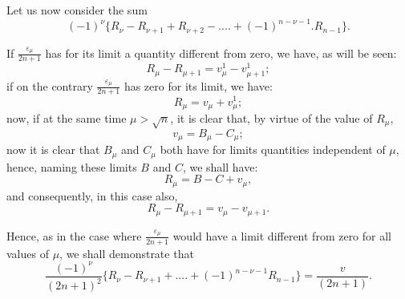 \documentclass{article}
\begin{document}
Let us now consider the sum
\[ (-1)^{\nu}\{R_{\nu}-R_{\nu+1}+R_{\nu+2}-....+(-1)^{n-\nu-1}.R_{n-1}\}. \]

If $\frac{\varepsilon_{\mu}}{2n+1}$ has for its limit a quantity different from zero, we have, as will be seen:
\[ R_{\mu}-R_{\mu+1}=v_{\mu}^{1}-v_{\mu+1}^{1}; \]
if on the contrary $\frac{\varepsilon_{\mu}}{2n+1}$ has zero for its limit, we have:
\[ R_{\mu}=v_{\mu}+v_{\mu}^{1}; \]
now, if at the same time $\mu>\sqrt{n}$, it is clear that, by virtue of the value of $R_{\mu}$,
\[ v_{\mu}=B_{\mu}-C_{\mu}; \]
now it is clear that $B_{\mu}$ and $C_{\mu}$ both have for limits quantities independent of $\mu$, hence, naming these limits $B$ and $C$, we shall have:
\[ R_{\mu}=B-C+v_{\mu}, \]
and consequently, in this case also,
\[ R_{\mu}-R_{\mu+1}=v_{\mu}-v_{\mu+1}. \]

Hence, as in the case where $\frac{\varepsilon_{\mu}}{2n+1}$ would have a limit different from zero for all values of $\mu$, we shall demonstrate that
\[ \frac{(-1)^{\nu}}{(2n+1)^{2}}\{R_{\nu}-R_{\nu+1}+....+(-1)^{n-\nu-1}R_{n-1}\}=\frac{v}{(2n+1)}. \]
\end{document}
